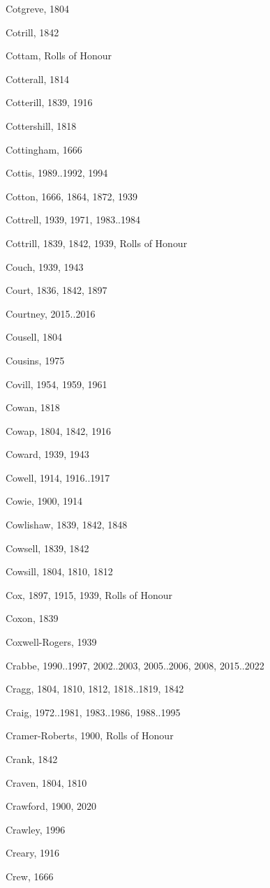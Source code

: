 {\begin{theindex}
\item Cotgreve, 1804
\item Cotrill, 1842
\item Cottam, Rolls of Honour
\item Cotterall, 1814
\item Cotterill, 1839, 1916
\item Cottershill, 1818
\item Cottingham, 1666
\item Cottis, 1989..1992, 1994
\item Cotton, 1666, 1864, 1872, 1939
\item Cottrell, 1939, 1971, 1983..1984
\item Cottrill, 1839, 1842, 1939, Rolls of Honour
\item Couch, 1939, 1943
\item Court, 1836, 1842, 1897
\item Courtney, 2015..2016
\item Cousell, 1804
\item Cousins, 1975
\item Covill, 1954, 1959, 1961
\item Cowan, 1818
\item Cowap, 1804, 1842, 1916
\item Coward, 1939, 1943
\item Cowell, 1914, 1916..1917
\item Cowie, 1900, 1914
\item Cowlishaw, 1839, 1842, 1848
\item Cowsell, 1839, 1842
\item Cowsill, 1804, 1810, 1812
\item Cox, 1897, 1915, 1939, Rolls of Honour
\item Coxon, 1839
\item Coxwell-Rogers, 1939
\item Crabbe, 1990..1997, 2002..2003, 2005..2006, 2008, 2015..2022
\item Cragg, 1804, 1810, 1812, 1818..1819, 1842
\item Craig, 1972..1981, 1983..1986, 1988..1995
\item Cramer-Roberts, 1900, Rolls of Honour
\item Crank, 1842
\item Craven, 1804, 1810
\item Crawford, 1900, 2020
\item Crawley, 1996
\item Creary, 1916
\item Crew, 1666

\end{theindex}}
